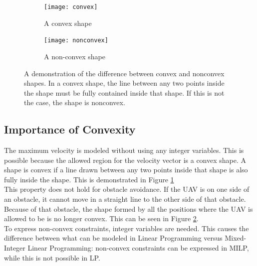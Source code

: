 \begin{figure}[h]
    \centering
    
    \begin{subfigure}[]{0.25\textwidth}
        \texttt{[image: convex]}
        \caption{A convex shape}
        \label{fig:convex-example}
    \end{subfigure}
    \hfil
    \begin{subfigure}[]{0.25\textwidth}
        \texttt{[image: nonconvex]}
        \caption{A non-convex shape}
        \label{fig:nonconvex-example}
    \end{subfigure}
    \caption[A demonstration of the difference between a convex and nonconvex shape]{A demonstration of the difference between convex and nonconvex shapes. In a convex shape, the line between any two points inside the shape must be fully contained inside that shape. If this is not the case, the shape is nonconvex.}\label{fig:convexity-example}
\end{figure}

\subsection{Importance of Convexity}
The maximum velocity is modeled without using any integer variables. This is possible because the allowed region for the velocity vector is a convex shape. A shape is convex if a line drawn between any two points inside that shape is also fully inside the shape. This is demonstrated in Figure \ref{fig:convex-example}\\
This property does not hold for obstacle avoidance. If the UAV is on one side of an obstacle, it cannot move in a straight line to the other side of that obstacle. Because of that obstacle, the shape formed by all the positions where the UAV is allowed to be is no longer convex. This can be seen in Figure \ref{fig:nonconvex-example}. \\
To express non-convex constraints, integer variables are needed. This causes the difference between what can be modeled in Linear Programming versus Mixed-Integer Linear Programming: non-convex constraints can be expressed in MILP, while this is not possible in LP.



